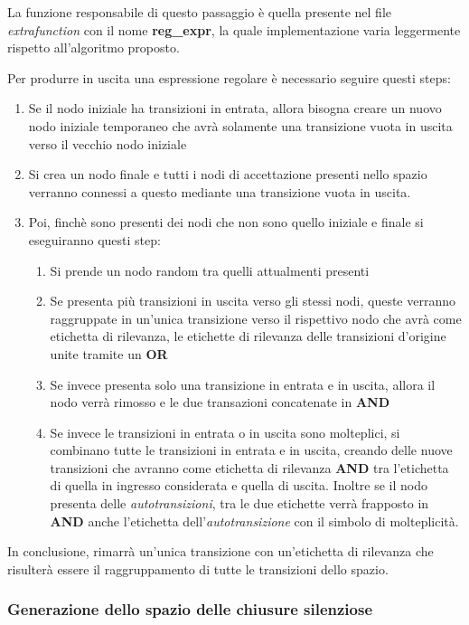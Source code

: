 La funzione responsabile di questo passaggio è quella presente nel file \textit{extrafunction} con il nome \textbf{reg\_expr}, la quale implementazione varia leggermente rispetto all’algoritmo proposto.

Per produrre in uscita una espressione regolare è necessario seguire questi steps:
\begin{enumerate}
    \item Se il nodo iniziale ha transizioni in entrata, allora bisogna creare un nuovo nodo iniziale temporaneo che avrà solamente una transizione vuota in uscita verso il vecchio nodo iniziale
    \item Si crea un nodo finale e tutti i nodi di accettazione presenti nello spazio verranno connessi a questo mediante una transizione vuota in uscita.
    \item Poi, finchè sono presenti dei nodi che non sono quello iniziale e finale si eseguiranno questi step:
    \begin{enumerate}
        \item Si prende un nodo random tra quelli attualmenti presenti
        \item Se presenta più transizioni in uscita verso gli stessi nodi, queste verranno raggruppate in un’unica transizione verso il rispettivo nodo che avrà come etichetta di rilevanza, le etichette di rilevanza delle transizioni d’origine unite tramite un \textbf{OR}
        \item Se invece presenta solo una transizione in entrata e in uscita, allora il nodo verrà rimosso e le due transazioni concatenate in \textbf{AND}
        \item Se invece le transizioni in entrata o in uscita sono molteplici, si combinano tutte le transizioni in entrata e in uscita, creando delle nuove transizioni che avranno come etichetta di rilevanza \textbf{AND} tra l’etichetta di quella in ingresso considerata e quella di uscita. Inoltre se il nodo presenta delle \textit{autotransizioni}, tra le due etichette verrà frapposto in \textbf{AND} anche l’etichetta dell’\textit{autotransizione} con il simbolo di molteplicità.
    \end{enumerate}
\end{enumerate}
In conclusione, rimarrà un’unica transizione con un’etichetta di rilevanza che risulterà essere il raggruppamento di tutte le transizioni dello spazio.
\subsubsection{Generazione dello spazio delle chiusure silenziose}

